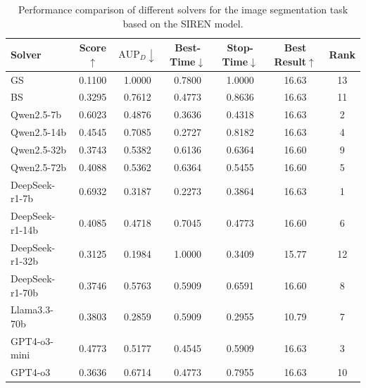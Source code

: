 \begin{table}[h]
    \centering
    \setlength{\tabcolsep}{3pt}
    \renewcommand\arraystretch{1.5} %
    \caption{Performance comparison of different solvers for the image segmentation task based on the SIREN model.}
    \begin{tabular}{l|cccccc}
    \toprule
    Solver           & Score$\uparrow$ & $\text{AUP}_D\downarrow$ & Best-Time$\downarrow$ & Stop-Time$\downarrow$ & Best Result$\uparrow$ & Rank \\
    \midrule
    GS & 0.1100 & 1.0000 & 0.7800 & 1.0000 & 16.63 & 13 \\
    BS & 0.3295 & 0.7612 & 0.4773 & 0.8636 & 16.63 & 11 \\
    Qwen2.5-7b & 0.6023 & 0.4876 & 0.3636 & 0.4318 & 16.63 & 2 \\
    Qwen2.5-14b & 0.4545 & 0.7085 & 0.2727 & 0.8182 & 16.63 & 4 \\
    Qwen2.5-32b & 0.3743 & 0.5382 & 0.6136 & 0.6364 & 16.60 & 9 \\
    Qwen2.5-72b & 0.4088 & 0.5362 & 0.6364 & 0.5455 & 16.60 & 5 \\
    DeepSeek-r1-7b & 0.6932 & 0.3187 & 0.2273 & 0.3864 & 16.63 & 1 \\
    DeepSeek-r1-14b & 0.4085 & 0.4718 & 0.7045 & 0.4773 & 16.60 & 6 \\
    DeepSeek-r1-32b & 0.3125 & 0.1984 & 1.0000 & 0.3409 & 15.77 & 12 \\
    DeepSeek-r1-70b & 0.3746 & 0.5763 & 0.5909 & 0.6591 & 16.60 & 8 \\
    Llama3.3-70b & 0.3803 & 0.2859 & 0.5909 & 0.2955 & 10.79 & 7 \\
    GPT4-o3-mini & 0.4773 & 0.5177 & 0.4545 & 0.5909 & 16.63 & 3 \\
    GPT4-o3 & 0.3636 & 0.6714 & 0.4773 & 0.7955 & 16.63 & 10 \\
    \bottomrule
    \end{tabular}
    \label{tab:siren_seg}
\end{table}

